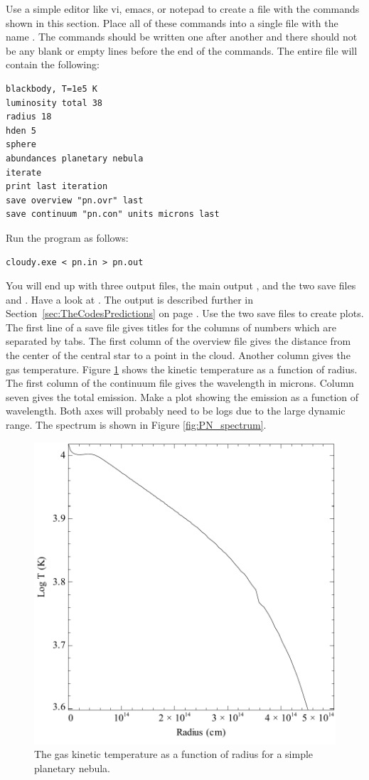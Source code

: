 \documentclass[12pt,twoside]{article}
\begin{document}
{Use a simple editor like vi, emacs, or notepad to create a file with
the commands shown in this section.
Place all of these commands
into a single file with the name .
The commands should be written
one after another and there should not be any blank or empty lines before
the end of the commands.
The entire file will contain the following:
\small
\begin{verbatim}
blackbody, T=1e5 K
luminosity total 38
radius 18
hden 5
sphere
abundances planetary nebula
iterate
print last iteration
save overview "pn.ovr" last
save continuum "pn.con" units microns last
\end{verbatim}
\normalsize
Run the program as follows:
\small
\begin{verbatim}
cloudy.exe < pn.in > pn.out
\end{verbatim}
\normalsize
You will end up with three output files,
the main output , and the
two save files  and .
Have a look at .  The output is
described further in Section~\ref{sec:TheCodesPredictions}
on page \pageref{sec:TheCodesPredictions}.
Use the two save
files to create plots.  The first line of
a save file gives titles for
the columns of numbers which are separated by tabs.
The first column of the overview file gives the distance
from the center of the central star to a point in the cloud.
Another column gives the gas temperature.
Figure \ref{fig:PN_temperature} shows the kinetic temperature as a function of radius.
The first column of the continuum file gives the wavelength in microns.
Column seven gives the total emission.  Make a plot showing the emission
as a function of wavelength.  Both axes will probably need to be logs due
to the large dynamic range.
The spectrum is shown in Figure \ref{fig:PN_spectrum}.

\begin{figure}
\begin{center}
\includegraphics[clip=on,width=0.8\columnwidth,height=0.8\textheight,keepaspectratio]{PN_temperature}
\end{center}
\caption{The gas kinetic temperature as a function of radius for a simple planetary nebula.}
\label{fig:PN_temperature}
\end{figure}

}
\end{document}
